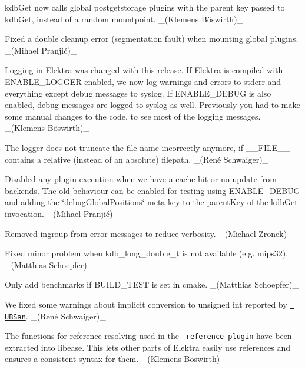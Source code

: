 \begin{DoxyItemize}
\item {\ttfamily kdb\+Get} now calls global postgetstorage plugins with the parent key passed to {\ttfamily kdb\+Get}, instead of a random mountpoint. \+\_\+(Klemens Böswirth)\+\_\+
\item Fixed a double cleanup error (segmentation fault) when mounting global plugins. \+\_\+(Mihael Pranjić)\+\_\+
\item Logging in Elektra was changed with this release. If Elektra is compiled with {\ttfamily E\+N\+A\+B\+L\+E\+\_\+\+L\+O\+G\+G\+ER} enabled, we now log warnings and errors to stderr and everything except debug messages to syslog. If {\ttfamily E\+N\+A\+B\+L\+E\+\_\+\+D\+E\+B\+UG} is also enabled, debug messages are logged to syslog as well. Previously you had to make some manual changes to the code, to see most of the logging messages. \+\_\+(Klemens Böswirth)\+\_\+
\item The logger does not truncate the file name incorrectly anymore, if {\ttfamily \+\_\+\+\_\+\+F\+I\+L\+E\+\_\+\+\_\+} contains a relative (instead of an absolute) filepath. \+\_\+(René Schwaiger)\+\_\+
\item Disabled any plugin execution when we have a cache hit or no update from backends. The old behaviour can be enabled for testing using {\ttfamily E\+N\+A\+B\+L\+E\+\_\+\+D\+E\+B\+UG} and adding the {\ttfamily \char`\"{}debug\+Global\+Positions\char`\"{}} meta key to the parent\+Key of the kdb\+Get invocation. \+\_\+(Mihael Pranjić)\+\_\+
\item Removed {\ttfamily ingroup} from error messages to reduce verbosity. \+\_\+(\+Michael Zronek)\+\_\+
\item Fixed minor problem when {\ttfamily kdb\+\_\+long\+\_\+double\+\_\+t} is not available (e.\+g. mips32). \+\_\+(\+Matthias Schoepfer)\+\_\+
\item Only add benchmarks if {\ttfamily B\+U\+I\+L\+D\+\_\+\+T\+E\+ST} is set in cmake. \+\_\+(\+Matthias Schoepfer)\+\_\+
\item We fixed some warnings about implicit conversion to {\ttfamily unsigned int} reported by \href{https://clang.llvm.org/docs/UndefinedBehaviorSanitizer.html}{\texttt{ U\+B\+San}}. \+\_\+(René Schwaiger)\+\_\+
\end{DoxyItemize}


\begin{DoxyItemize}
\item The functions for reference resolving used in the \href{https://www.libelektra.org/plugins/reference}{\texttt{ reference plugin}} have been extracted into libease. This lets other parts of Elektra easily use references and ensures a consistent syntax for them. \+\_\+(Klemens Böswirth)\+\_\+
\end{DoxyItemize}

